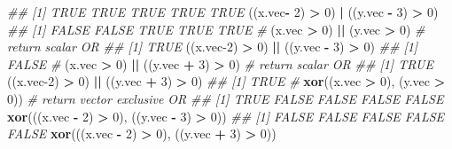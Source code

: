 \documentclass[
]{book}
\newenvironment{Shaded}{\begin{snugshade}}{\end{snugshade}}
\newcommand{\CommentTok}[1]{\textcolor[rgb]{0.56,0.35,0.01}{\textit{#1}}}
\newcommand{\DecValTok}[1]{\textcolor[rgb]{0.00,0.00,0.81}{#1}}
\newcommand{\KeywordTok}[1]{\textcolor[rgb]{0.13,0.29,0.53}{\textbf{#1}}}
\newcommand{\NormalTok}[1]{#1}
\newcommand{\OperatorTok}[1]{\textcolor[rgb]{0.81,0.36,0.00}{\textbf{#1}}}
\newcommand{\StringTok}[1]{\textcolor[rgb]{0.31,0.60,0.02}{#1}}
\begin{document}
\begin{Shaded}
\begin{Highlighting}[]
\CommentTok{\#\# [1] TRUE TRUE TRUE TRUE TRUE}
\NormalTok{((x.vec}\OperatorTok{{-}}\StringTok{ }\DecValTok{2}\NormalTok{) }\OperatorTok{\textgreater{}}\StringTok{ }\DecValTok{0}\NormalTok{) }\OperatorTok{|}\StringTok{ }\NormalTok{((y.vec }\OperatorTok{{-}}\StringTok{ }\DecValTok{3}\NormalTok{) }\OperatorTok{\textgreater{}}\StringTok{ }\DecValTok{0}\NormalTok{)}
\CommentTok{\#\# [1] FALSE FALSE  TRUE  TRUE  TRUE}
\CommentTok{\#}
\NormalTok{(x.vec }\OperatorTok{\textgreater{}}\StringTok{ }\DecValTok{0}\NormalTok{) }\OperatorTok{||}\StringTok{ }\NormalTok{(y.vec }\OperatorTok{\textgreater{}}\StringTok{ }\DecValTok{0}\NormalTok{) }\CommentTok{\# return scalar OR}
\CommentTok{\#\# [1] TRUE}
\NormalTok{((x.vec}\DecValTok{{-}2}\NormalTok{) }\OperatorTok{\textgreater{}}\StringTok{ }\DecValTok{0}\NormalTok{) }\OperatorTok{||}\StringTok{ }\NormalTok{((y.vec }\OperatorTok{{-}}\StringTok{ }\DecValTok{3}\NormalTok{) }\OperatorTok{\textgreater{}}\StringTok{ }\DecValTok{0}\NormalTok{)}
\CommentTok{\#\# [1] FALSE}
\CommentTok{\#}
\NormalTok{(x.vec }\OperatorTok{\textgreater{}}\StringTok{ }\DecValTok{0}\NormalTok{) }\OperatorTok{||}\StringTok{ }\NormalTok{((y.vec }\OperatorTok{+}\StringTok{ }\DecValTok{3}\NormalTok{) }\OperatorTok{\textgreater{}}\StringTok{ }\DecValTok{0}\NormalTok{) }\CommentTok{\# return scalar OR}
\CommentTok{\#\# [1] TRUE}
\NormalTok{((x.vec}\DecValTok{{-}2}\NormalTok{) }\OperatorTok{\textgreater{}}\StringTok{ }\DecValTok{0}\NormalTok{) }\OperatorTok{||}\StringTok{ }\NormalTok{((y.vec }\OperatorTok{+}\StringTok{ }\DecValTok{3}\NormalTok{) }\OperatorTok{\textgreater{}}\StringTok{ }\DecValTok{0}\NormalTok{)}
\CommentTok{\#\# [1] TRUE}
\CommentTok{\#}
\KeywordTok{xor}\NormalTok{((x.vec }\OperatorTok{\textgreater{}}\StringTok{ }\DecValTok{0}\NormalTok{), (y.vec }\OperatorTok{\textgreater{}}\StringTok{ }\DecValTok{0}\NormalTok{)) }\CommentTok{\# return vector exclusive OR}
\CommentTok{\#\# [1]  TRUE FALSE FALSE FALSE FALSE}
\KeywordTok{xor}\NormalTok{(((x.vec }\OperatorTok{{-}}\StringTok{ }\DecValTok{2}\NormalTok{) }\OperatorTok{\textgreater{}}\StringTok{ }\DecValTok{0}\NormalTok{), ((y.vec }\OperatorTok{{-}}\StringTok{ }\DecValTok{3}\NormalTok{) }\OperatorTok{\textgreater{}}\StringTok{ }\DecValTok{0}\NormalTok{))}
\CommentTok{\#\# [1] FALSE FALSE FALSE FALSE FALSE}
\KeywordTok{xor}\NormalTok{(((x.vec }\OperatorTok{{-}}\StringTok{ }\DecValTok{2}\NormalTok{) }\OperatorTok{\textgreater{}}\StringTok{ }\DecValTok{0}\NormalTok{), ((y.vec }\OperatorTok{+}\StringTok{ }\DecValTok{3}\NormalTok{) }\OperatorTok{\textgreater{}}\StringTok{ }\DecValTok{0}\NormalTok{))}

\end{Highlighting}
\end{Shaded}
\end{document}
